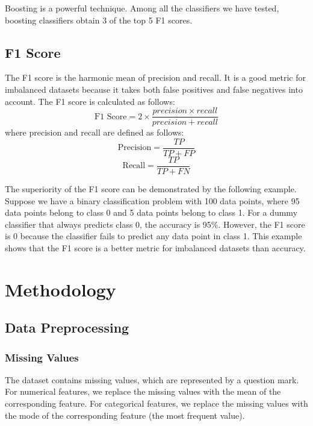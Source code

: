 \documentclass[conference]{IEEEtran}
\begin{document}
Boosting is a powerful technique.
Among all the classifiers we have tested, boosting classifiers obtain 3 of the top 5 F1 scores.

\subsection{F1 Score}

The F1 score is the harmonic mean of precision and recall.
It is a good metric for imbalanced datasets because it takes both false positives and false negatives into account.
The F1 score is calculated as follows:
\begin{equation}
    \text{F1 Score} = 2 \times \frac{precision \times recall}{precision + recall}
\end{equation}
where precision and recall are defined as follows:
\begin{equation}
    \text{Precision} = \frac{TP}{TP + FP}
\end{equation}
\begin{equation}
    \text{Recall} = \frac{TP}{TP + FN}
\end{equation}

The superiority of the F1 score can be demonstrated by the following example.
Suppose we have a binary classification problem with 100 data points, where 95 data points belong to class 0 and 5 data points belong to class 1.
For a dummy classifier that always predicts class 0, the accuracy is 95\%.
However, the F1 score is 0 because the classifier fails to predict any data point in class 1.
This example shows that the F1 score is a better metric for imbalanced datasets than accuracy.

\section{Methodology}

\subsection{Data Preprocessing}

\subsubsection{Missing Values}

The dataset contains missing values, which are represented by a question mark.
For numerical features, we replace the missing values with the mean of the corresponding feature.
For categorical features, we replace the missing values with the mode of the corresponding feature (the most frequent value).
\end{document}
